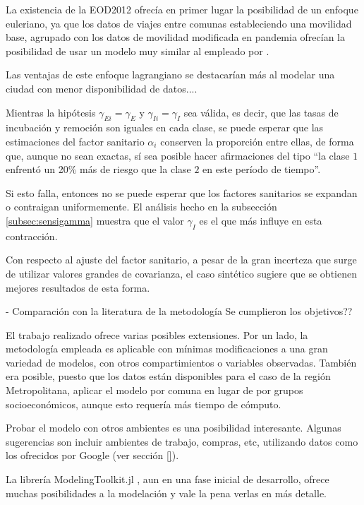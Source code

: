 La existencia de la EOD2012 ofrecía en primer lugar la posibilidad de un enfoque euleriano, ya que los datos de viajes entre comunas estableciendo una movilidad base, agrupado con los datos de movilidad modificada en pandemia ofrecían la posibilidad de usar un modelo muy similar al empleado por \cite{Lai2020}.


Las ventajas de este enfoque lagrangiano se destacarían más al modelar una ciudad con menor disponibilidad de datos....


Mientras la hipótesis \(\gamma_{Ei} = \gamma_E\) y \(\gamma_{Ii} = \gamma_I\) sea válida, es decir, que las tasas de incubación y remoción son iguales en cada clase, se puede esperar que las estimaciones del factor sanitario \(\alpha_i\) conserven la proporción entre ellas, de forma que, aunque no sean exactas, sí sea posible hacer afirmaciones del tipo ``la clase \(1\) enfrentó un 20\% más de riesgo que la clase \(2\) en este período de tiempo''. 

Si esto falla, entonces no se puede esperar que los factores sanitarios se expandan o contraigan uniformemente. El análisis hecho en la subsección \ref{subsec:sensigamma} muestra que el valor \(\gamma_I\) es el que más influye en esta contracción.

Con respecto al ajuste del factor sanitario, a pesar de la gran incerteza que surge de utilizar valores grandes de covarianza, el caso sintético sugiere que se obtienen mejores resultados de esta forma.

- Comparación con la literatura de la metodología 
Se cumplieron los objetivos??



El trabajo realizado ofrece varias posibles extensiones. Por un lado, la metodología empleada es aplicable con mínimas modificaciones a una gran variedad de modelos, con otros compartimientos o variables observadas. También era posible, puesto que los datos están disponibles para el caso de la región Metropolitana, aplicar el modelo por comuna en lugar de por grupos socioeconómicos, aunque esto requería más tiempo de cómputo. 

Probar el modelo con otros ambientes es una posibilidad interesante. Algunas sugerencias son incluir ambientes de trabajo, compras, etc, utilizando datos como los ofrecidos por Google (ver sección \ref{}).

La librería ModelingToolkit.jl \cite{}, aun en una fase inicial de desarrollo, ofrece muchas posibilidades a la modelación y vale la pena verlas en más detalle.